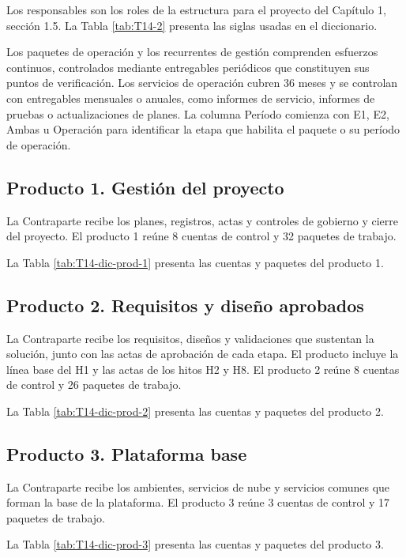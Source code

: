 Los responsables son los roles de la estructura para el proyecto del Capítulo 1, sección 1.5. La Tabla \ref{tab:T14-2} presenta las siglas usadas en el diccionario.


Los paquetes de operación y los recurrentes de gestión comprenden esfuerzos continuos, controlados mediante entregables periódicos que constituyen sus puntos de verificación. Los servicios de operación cubren 36 meses y se controlan con entregables mensuales o anuales, como informes de servicio, informes de pruebas o actualizaciones de planes. La columna Período comienza con E1, E2, Ambas u Operación para identificar la etapa que habilita el paquete o su período de operación.

\subsection{Producto 1. Gestión del proyecto}

La Contraparte recibe los planes, registros, actas y controles de gobierno y cierre del proyecto.
El producto 1 reúne 8 cuentas de control y 32 paquetes de trabajo.

La Tabla \ref{tab:T14-dic-prod-1} presenta las cuentas y paquetes del producto 1.

\subsection{Producto 2. Requisitos y diseño aprobados}

La Contraparte recibe los requisitos, diseños y validaciones que sustentan la solución, junto con las actas de aprobación de cada etapa. El producto incluye la línea base del H1 y las actas de los hitos H2 y H8.
El producto 2 reúne 8 cuentas de control y 26 paquetes de trabajo.

La Tabla \ref{tab:T14-dic-prod-2} presenta las cuentas y paquetes del producto 2.

\subsection{Producto 3. Plataforma base}

La Contraparte recibe los ambientes, servicios de nube y servicios comunes que forman la base de la plataforma.
El producto 3 reúne 3 cuentas de control y 17 paquetes de trabajo.

La Tabla \ref{tab:T14-dic-prod-3} presenta las cuentas y paquetes del producto 3.

